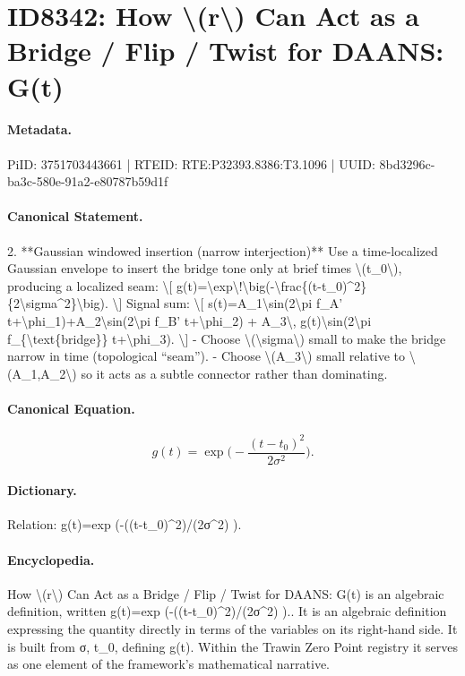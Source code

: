 \section*{ID8342: How \textbackslash{}(r\textbackslash{}) Can Act as a Bridge / Flip / Twist for DAANS: G(t)}
\paragraph{Metadata.}
PiID: 3751703443661 | RTEID: RTE:P32393.8386:T3.1096 | UUID: 8bd3296c-ba3c-580e-91a2-e80787b59d1f

\paragraph{Canonical Statement.}
2. **Gaussian windowed insertion (narrow interjection)** Use a time-localized Gaussian envelope to insert the bridge tone only at brief times \textbackslash{}(t\_0\textbackslash{}), producing a localized seam: \textbackslash{}[ g(t)=\textbackslash{}exp\textbackslash{}!\textbackslash{}big(-\textbackslash{}frac\{(t-t\_0)\textasciicircum{}2\}\{2\textbackslash{}sigma\textasciicircum{}2\}\textbackslash{}big). \textbackslash{}] Signal sum: \textbackslash{}[ s(t)=A\_1\textbackslash{}sin(2\textbackslash{}pi f\_A' t+\textbackslash{}phi\_1)+A\_2\textbackslash{}sin(2\textbackslash{}pi f\_B' t+\textbackslash{}phi\_2) + A\_3\textbackslash{}, g(t)\textbackslash{}sin(2\textbackslash{}pi f\_\{\textbackslash{}text\{bridge\}\} t+\textbackslash{}phi\_3). \textbackslash{}] - Choose \textbackslash{}(\textbackslash{}sigma\textbackslash{}) small to make the bridge narrow in time (topological “seam”). - Choose \textbackslash{}(A\_3\textbackslash{}) small relative to \textbackslash{}(A\_1,A\_2\textbackslash{}) so it acts as a subtle connector rather than dominating.

\paragraph{Canonical Equation.}
\[
g(t)=\exp\!\big(-\frac{(t-t_0)^2}{2\sigma^2}\big).
\]

\paragraph{Dictionary.}
Relation: g(t)=exp (-((t-t\_0)\textasciicircum{}2)/(2σ\textasciicircum{}2) ).

\paragraph{Encyclopedia.}
How \textbackslash{}(r\textbackslash{}) Can Act as a Bridge / Flip / Twist for DAANS: G(t) is an algebraic definition, written g(t)=exp (-((t-t\_0)\textasciicircum{}2)/(2σ\textasciicircum{}2) ).. It is an algebraic definition expressing the quantity directly in terms of the variables on its right-hand side. It is built from σ, t\_0, defining g(t). Within the Trawin Zero Point registry it serves as one element of the framework's mathematical narrative.
